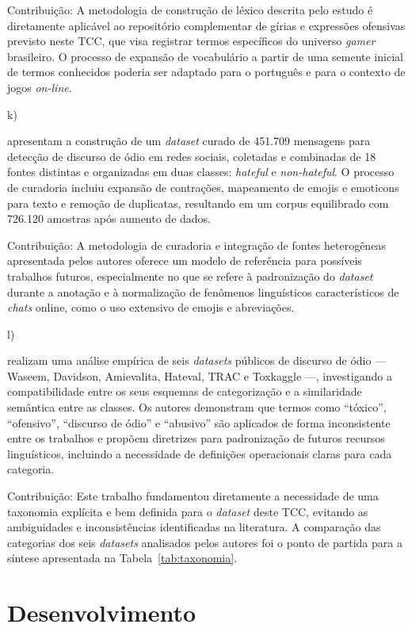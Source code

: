 \documentclass{eic-bcc-tcc}
\begin{document}
Contribuição: A metodologia de construção de léxico descrita pelo estudo é diretamente aplicável ao repositório complementar de gírias e expressões ofensivas previsto neste TCC, que visa registrar termos específicos do universo \textit{gamer} brasileiro. O processo de expansão de vocabulário a partir de uma semente inicial de termos conhecidos poderia ser adaptado para o português e para o contexto de jogos \textit{on-line}.


k) \cite{mody2023curated}

\cite{mody2023curated} apresentam a construção de um \textit{dataset} curado de 451.709 mensagens para detecção de discurso de ódio em redes sociais, coletadas e combinadas de 18 fontes distintas e organizadas em duas classes: \textit{hateful} e \textit{non-hateful}. O processo de curadoria incluiu expansão de contrações, mapeamento de emojis e emoticons para texto e remoção de duplicatas, resultando em um corpus equilibrado com 726.120 amostras após aumento de dados.

Contribuição: A metodologia de curadoria e integração de fontes heterogêneas apresentada pelos autores oferece um modelo de referência para possíveis trabalhos futuros, especialmente no que se refere à padronização do \textit{dataset} durante a anotação e à normalização de fenômenos linguísticos característicos de \textit{chats} online, como o uso extensivo de emojis e abreviações.


l) \cite{fortuna2020toxic}

\cite{fortuna2020toxic} realizam uma análise empírica de seis \textit{datasets} públicos de discurso de ódio — Waseem, Davidson, Amievalita, Hateval, TRAC e Toxkaggle —, investigando a compatibilidade entre os seus esquemas de categorização e a similaridade semântica entre as classes. Os autores demonstram que termos como ``tóxico'', ``ofensivo'', ``discurso de ódio'' e ``abusivo'' são aplicados de forma inconsistente entre os trabalhos e propõem diretrizes para padronização de futuros recursos linguísticos, incluindo a necessidade de definições operacionais claras para cada categoria.

Contribuição: Este trabalho fundamentou diretamente a necessidade de uma taxonomia explícita e bem definida para o \textit{dataset} deste TCC, evitando as ambiguidades e inconsistências identificadas na literatura. A comparação das categorias dos seis \textit{datasets} analisados pelos autores foi o ponto de partida para a síntese apresentada na Tabela~\ref{tab:taxonomia}.

\chapter{Desenvolvimento}
\label{cha:desenvolvimento}
\end{document}
